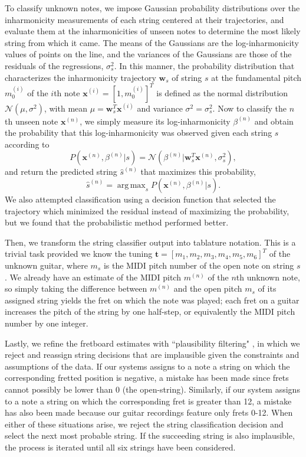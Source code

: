 \documentclass[convention,peer-reviewed]{aesconf}
\DeclareMathOperator*{\argmax}{arg\,max}
\begin{document}
To classify unknown notes, we impose Gaussian probability distributions over the inharmonicity measurements of each string centered at their trajectories, and evaluate them at the inharmonicities of unseen notes to determine the most likely string from which it came. The means of the Gaussians are the log-inharmonicity values of points on the line, and the variances of the Gaussians are those of the residuals of the regressions, $\sigma_s^2$. In this manner, the probability distribution that characterizes the inharmonicity trajectory $\mathbf{w}_s$ of string $s$ at the fundamental pitch $m_0^{(i)}$ of the $i$th note $\mathbf{x}^{(i)} = [1,m_0^{(i)}]^T$ is defined as the normal distribution $\mathcal{N}(\mu, \sigma^2)$, with mean $\mu = \mathbf{w}_s^T\mathbf{x}^{(i)}$ and variance $\sigma^2 = \sigma_s^2$. Now to classify the $n$th unseen note $\mathbf{x}^{(n)}$, we simply measure its log-inharmonicity $\beta^{(n)}$ and obtain the probability that this log-inharmonicity was observed given each string $s$ according to
\begin{equation}
P(\mathbf{x}^{(n)},\beta^{(n)} | s) = \mathcal{N}(\beta^{(n)} | \mathbf{w}_s^T\mathbf{x}^{(n)},\sigma_s^2),
\end{equation}
and return the predicted string $\hat{s}^{(n)}$ that maximizes this probability,
\begin{equation}
\hat{s}^{(n)} = \argmax_{s}P(\mathbf{x}^{(n)},\beta^{(n)} | s).
\label{eq:string-argmax}
\end{equation}
We also attempted classification using a decision function that selected the trajectory which minimized the residual instead of maximizing the probability, but we found that the probabilistic method performed better.

Then, we transform the string classifier output into tablature notation. This is a trivial task provided we know the tuning $\mathbf{t} = [m_1, m_2, m_3, m_4, m_5, m_6]^T$ of the unknown guitar, where $m_s$ is the MIDI pitch number of the open note on string $s$. We already have an estimate of the MIDI pitch $m^{(n)}$ of the $n$th unknown note, so simply taking the difference between $m^{(n)}$ and the open pitch $m_s$ of its assigned string yields the fret on which the note was played; each fret on a guitar increases the pitch of the string by one half-step, or equivalently the MIDI pitch number by one integer.

Lastly, we refine the fretboard estimates with ``plausibility filtering" \citep{abesser2012}, in which we reject and reassign string decisions that are implausible given the constraints and assumptions of the data. If our systems assigns to a note a string on which the corresponding fretted position is negative, a mistake has been made since frets cannot possibly be lower than 0 (the open-string). Similarly, if our system assigns to a note a string on which the corresponding fret is greater than 12, a mistake has also been made because our guitar recordings feature only frets 0-12. When either of these situations arise, we reject the string classification decision and select the next most probable string. If the succeeding string is also implausible, the process is iterated until all six strings have been considered.
\end{document}
